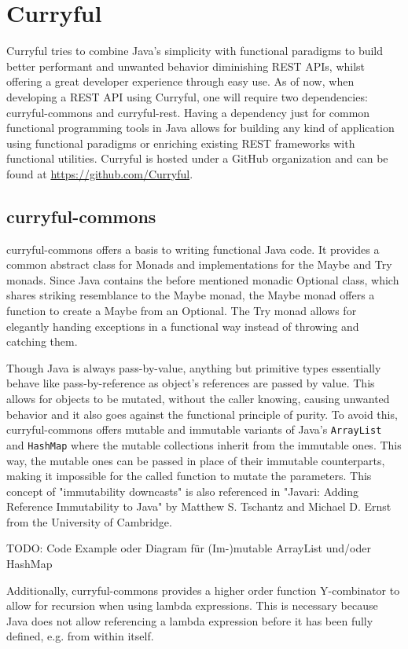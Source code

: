 \documentclass[a4paper]{article}
\begin{document}
\section{Curryful}
Curryful tries to combine Java's simplicity with functional paradigms to build
better performant and unwanted behavior diminishing REST APIs, whilst offering
a great developer experience through easy use. As of now, when developing a REST
API using Curryful, one will require two dependencies: curryful-commons and
curryful-rest. Having a dependency just for common functional programming tools
in Java allows for building any kind of application using functional paradigms
or enriching existing REST frameworks with functional utilities. Curryful is
hosted under a GitHub organization and can be found at
\url{https://github.com/Curryful}.

\subsection{curryful-commons}
curryful-commons offers a basis to writing functional Java code. It provides a
common abstract class for Monads and implementations for the Maybe and Try
monads. Since Java contains the before mentioned monadic Optional class, which
shares striking resemblance to the Maybe monad, the Maybe monad offers a
function to create a Maybe from an Optional. The Try monad allows for elegantly
handing exceptions in a functional way instead of throwing and catching them.

Though Java is always pass-by-value, anything but primitive types essentially
behave like pass-by-reference as object's references are passed by value.
\cite{hott2024java} This allows for objects to be mutated, without the caller
knowing, causing unwanted behavior and it also goes against the functional
principle of purity. To avoid this, curryful-commons offers mutable and
immutable variants of Java's \verb|ArrayList| and \verb|HashMap| where the
mutable collections inherit from the immutable ones. This way, the mutable ones
can be passed in place of their immutable counterparts, making it impossible for
the called function to mutate the parameters. This concept of "immutability
downcasts" is also referenced in "Javari: Adding Reference Immutability to Java"
\cite{tschantz2005javari} by Matthew S. Tschantz and Michael D. Ernst from the
University of Cambridge.

TODO: Code Example oder Diagram für (Im-)mutable ArrayList und/oder HashMap

Additionally, curryful-commons provides a higher order function Y-combinator to
allow for recursion when using lambda expressions. This is necessary because
Java does not allow referencing a lambda expression before it has been fully
defined, e.g. from within itself.
\end{document}
